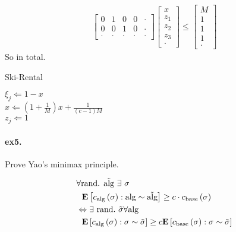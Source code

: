 \documentclass{article}
\begin{document}
\begin{multicols*}{2}
\begin{equation*}
\begin{split}
\begin{bmatrix}
	0 & 1 & 0 & 0 & \cdot \\
	0 & 0 & 1 & 0 & \cdot \\
	\cdot & \cdot & \cdot & \cdot & \cdot
      \end{bmatrix} 
      \begin{bmatrix}
	x \\
	z_{1} \\ 
	z_{2} \\
	z_{3} \\
	\cdot 
      \end{bmatrix} \le
      \begin{bmatrix}
	M \\
	1 \\ 
	1 \\
	1 \\
	\cdot 
      \end{bmatrix}
    \end{split}
  \end{equation*}
  So in total.

\begin{algorithm}[H]
    \caption{Ski-Rental}
    \label{alg:three}
     {
       { 
	$ \xi_{j} \Leftarrow 1 - x$ \\
	$ x \Leftarrow \left( 1 + \frac{1}{M} \right) x + \frac{1}{\left( c - 1  \right) M } $ \\
	$ z_{j} \Leftarrow 1$
      }
    }
  \end{algorithm}
  \paragraph{ex5.} Prove Yao's minimax principle. 

  \begin{equation*}
    \begin{split}
      & \forall \text{rand. } \tilde{\text{alg}} \  \exists  \ \sigma  \\
      & \ \ \dalg{ \calg\left( \sigma \right) } \ge c \cdot   \cbase\left( \sigma \right) \\  
      & \Leftrightarrow \exists \ \text{rand.} \ \tilde{\sigma} \forall \text{alg} \\  
      & \ \ \dsig{  \calg\left( \sigma \right)  } \ge c \dsig{ \cbase \left( \sigma \right)  } 
    \end{split}
  \end{equation*}

\end{multicols*}
\end{document}
